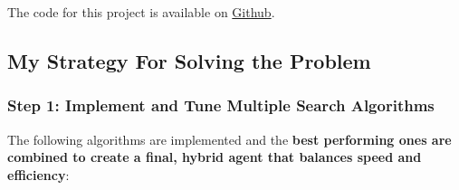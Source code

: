 The code for this project is available on \href{https://github.com/sidharrth2002/ci-quarto-sidharrth}{Github}.

\subsection{My Strategy For Solving the Problem}

\subsubsection{Step 1: Implement and Tune Multiple Search Algorithms}

The following algorithms are implemented and the \textbf{best performing ones are combined to create a final, hybrid agent that balances speed and efficiency}:

